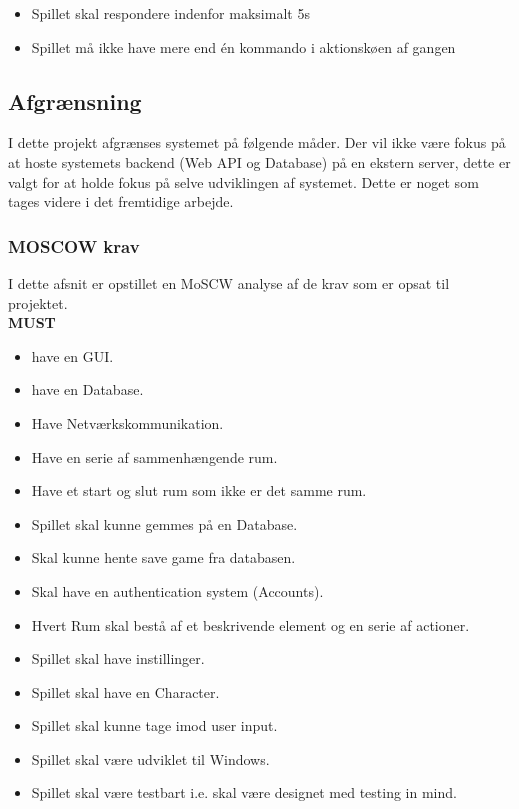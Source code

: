 \begin{itemize}
\item Spillet skal respondere indenfor maksimalt 5s
\item Spillet må ikke have mere end én kommando i aktionskøen af gangen
\end{itemize}

\newpage
    

\subsection{Afgrænsning}
I dette projekt afgrænses systemet på følgende måder. Der vil ikke være fokus på at hoste systemets backend (Web API og Database) på en ekstern server, dette er valgt for at holde fokus på selve udviklingen af systemet. Dette er noget som tages videre i det fremtidige arbejde.  

\subsubsection{MOSCOW krav}
\label{sssec:MOSCOW}
I dette afsnit er opstillet en MoSCW analyse af de krav som er opsat til projektet.\\

\textbf{MUST}
\begin{itemize}

\item have en GUI.
\item have en Database.
\item Have Netværkskommunikation.
\item Have en serie af sammenhængende rum.
\item Have et start og slut rum som ikke er det samme rum.
\item Spillet skal kunne gemmes på en Database.
\item Skal kunne hente save game fra databasen.
\item Skal have en authentication system (Accounts).
\item Hvert Rum skal bestå af et beskrivende element og en serie af actioner.
\item Spillet skal have instillinger.
\item Spillet skal have en Character.
\item Spillet skal kunne tage imod user input.
\item Spillet skal være udviklet til Windows.
\item Spillet skal være testbart i.e. skal være designet med testing in mind.

\end{itemize}


